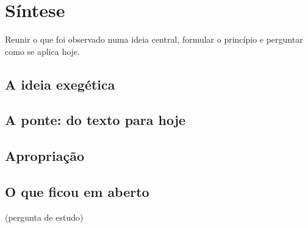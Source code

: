 \chapter{Síntese}\label{cap:sintese}

\begin{objetivo}
Reunir o que foi observado numa ideia central, formular o princípio e perguntar como se aplica hoje.
\end{objetivo}

\section{A ideia exegética}

\section{A ponte: do texto para hoje}

\section{Apropriação}

\section{O que ficou em aberto}

\begin{pergunta}
(pergunta de estudo)
\end{pergunta}
